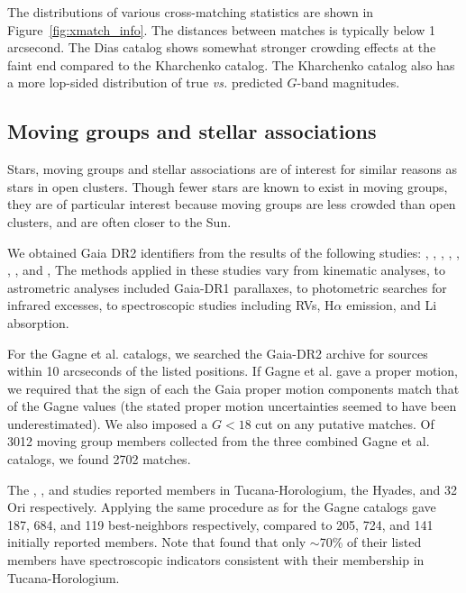 \documentclass[12pt,twocolumn,tighten]{aastex62}
\begin{document}
The distributions of various cross-matching statistics are shown in
Figure~\ref{fig:xmatch_info}.  The distances between matches is
typically below 1 arcsecond.  The Dias catalog shows somewhat stronger
crowding effects at the faint end compared to the Kharchenko catalog.
The Kharchenko catalog also has a more lop-sided distribution of true
{\it vs.} predicted $G$-band magnitudes.


\subsection{Moving groups and stellar associations}
\label{subsec:mg}

Stars, moving groups and stellar associations are of interest for
similar reasons as stars in open clusters.  Though fewer stars
are known to exist in moving groups, they are of particular interest
because moving groups are less crowded than open clusters, and are
often closer to the Sun.

We obtained Gaia DR2 identifiers from the results of the following
studies:
\citet{gagne_banyan_XI_2018},
\citet{gagne_banyan_XII_2018},
\citet{gagne_banyan_XIII_2018},
\citet{kraus_tucanahor_2014},
\citet{roser_deep_2011}, %
\citet{bell_32ori_2017},
\citet{rizzuto_multidimensional_2011},
and \citet{oh_comoving_2017}, The methods applied in these studies
vary from kinematic analyses, to astrometric analyses included
Gaia-DR1 parallaxes, to photometric searches for infrared excesses, to
spectroscopic studies including RVs, H$\alpha$
emission, and Li absorption.

For the Gagne et al{.} catalogs, we searched the Gaia-DR2 archive for
sources within 10 arcseconds of the listed positions.  If Gagne et
al{.} gave a proper motion, we required that the sign of each the Gaia
proper motion components match that of the Gagne values (the stated
proper motion uncertainties seemed to have been underestimated).  We
also imposed a $G<18$ cut on any putative matches.  Of 3012 moving
group members collected from the three combined Gagne et al{.}
catalogs, we found 2702 matches.

The \citet{kraus_tucanahor_2014}, \citet{roser_deep_2011}, and
\citet{bell_32ori_2017} studies reported members in Tucana-Horologium,
the Hyades, and 32$\,$Ori respectively.  Applying the same procedure as
for the Gagne catalogs gave 187, 684, and 119 best-neighbors
respectively, compared to 205, 724, and 141 initially reported
members.  Note that \citet{kraus_tucanahor_2014} found that only
$\sim$70\% of their listed members have spectroscopic indicators
consistent with their membership in Tucana-Horologium.
\end{document}

